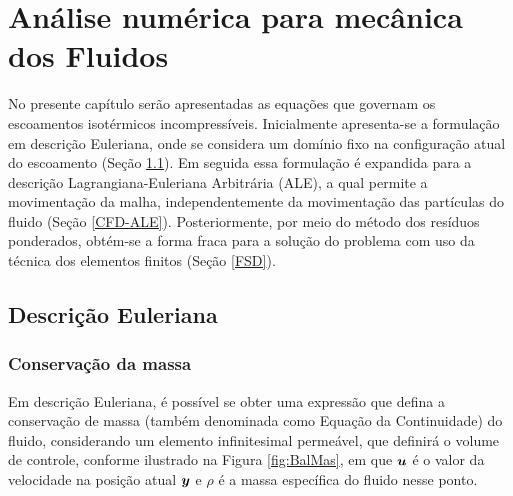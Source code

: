 \chapter{Análise numérica para mecânica dos Fluidos} \label{EGDF}

No presente capítulo serão apresentadas as equações que governam os escoamentos isotérmicos incompressíveis. Inicialmente apresenta-se a formulação em descrição Euleriana, onde se considera um domínio fixo na configuração atual do escoamento (Seção \ref{CFD-E}). Em seguida essa formulação é expandida para a descrição Lagrangiana-Euleriana Arbitrária (ALE), a qual permite a movimentação da malha, independentemente da movimentação das partículas do fluido (Seção \ref{CFD-ALE}). Posteriormente, por meio do método dos resíduos ponderados, obtém-se a forma fraca para a solução do problema com uso da técnica dos elementos finitos (Seção \ref{FSD}).%

\section{Descrição Euleriana} \label{CFD-E}

\subsection{Conservação da massa}

Em descrição Euleriana, é possível se obter uma expressão que defina a conservação de massa (também denominada como Equação da Continuidade) do fluido, considerando um elemento infinitesimal permeável, que definirá o volume de controle, conforme ilustrado na Figura \ref{fig:BalMas}, em que $\boldsymbol{u}$ é o valor da velocidade na posição atual $\boldsymbol{y}$ e $\rho$ é a massa específica do fluido nesse ponto.

